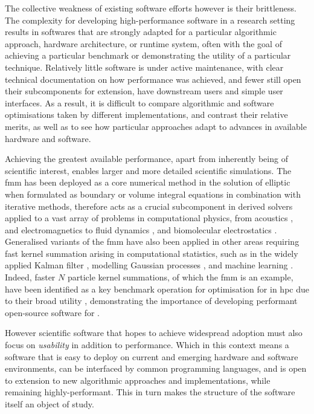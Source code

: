 The collective weakness of existing software efforts however is their brittleness. The complexity for developing high-performance software in a research setting results in softwares that are strongly adapted for a particular algorithmic approach, hardware architecture, or runtime system, often with the goal of achieving a particular benchmark or demonstrating the utility of a particular technique. Relatively little software is under active maintenance, with clear technical documentation on how performance was achieved, and fewer still open their subcomponents for extension, have downstream users and simple user interfaces. As a result, it is difficult to compare algorithmic and software optimisations taken by different implementations, and contrast their relative merits, as well as to see how particular approaches adapt to advances in available hardware and software.

Achieving the greatest available performance, apart from inherently being of scientific interest, enables larger and more detailed scientific simulations. The \acrshort{fmm} has been deployed as a core numerical method in the solution of elliptic  when formulated as boundary or volume integral equations in combination with iterative methods, therefore acts as a crucial subcomponent in derived solvers applied to a vast array of problems in computational physics, from acoustics \cite{hao2015efficient}, and electromagnetics \cite{darve2004fast} to fluid dynamics \cite{darve2004fast}, and biomolecular electrostatics \cite{yokota2011biomolecular, wang2021high}. Generalised variants of the \acrshort{fmm} have also been applied in other areas requiring fast kernel summation arising in computational statistics, such as in the widely applied Kalman filter \cite{li2014kalman}, modelling Gaussian processes \cite{ambikasaran2014fast}, and machine learning \cite{gray2000n, march2017far}. Indeed, faster $N$ particle kernel summations, of which the \acrshort{fmm} is an example, have been identified as a key benchmark operation for optimisation for in \acrshort{hpc} due to their broad utility \cite{asanovic2006landscape}, demonstrating the importance of developing performant open-source software for .

However scientific software that hopes to achieve widespread adoption must also focus on \textit{usability} in addition to performance. Which in this context means a software that is easy to deploy on current and emerging hardware and software environments, can be interfaced by common programming languages, and is open to extension to new algorithmic approaches and implementations, while remaining highly-performant. This in turn makes the structure of the software itself an object of study.

